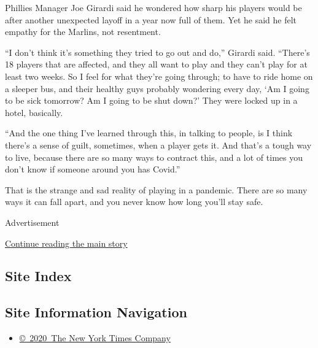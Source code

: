 Phillies Manager Joe Girardi said he wondered how sharp his players
would be after another unexpected layoff in a year now full of them. Yet
he said he felt empathy for the Marlins, not resentment.

``I don't think it's something they tried to go out and do,'' Girardi
said. ``There's 18 players that are affected, and they all want to play
and they can't play for at least two weeks. So I feel for what they're
going through; to have to ride home on a sleeper bus, and their healthy
guys probably wondering every day, `Am I going to be sick tomorrow? Am I
going to be shut down?' They were locked up in a hotel, basically.

``And the one thing I've learned through this, in talking to people, is
I think there's a sense of guilt, sometimes, when a player gets it. And
that's a tough way to live, because there are so many ways to contract
this, and a lot of times you don't know if someone around you has
Covid.''

That is the strange and sad reality of playing in a pandemic. There are
so many ways it can fall apart, and you never know how long you'll stay
safe.

Advertisement

\protect\hyperlink{after-bottom}{Continue reading the main story}

\hypertarget{site-index}{%
\subsection{Site Index}\label{site-index}}

\hypertarget{site-information-navigation}{%
\subsection{Site Information
Navigation}\label{site-information-navigation}}

\begin{itemize}
\tightlist
\item
  \href{https://help.nytimes3xbfgragh.onion/hc/en-us/articles/115014792127-Copyright-notice}{©~2020~The
  New York Times Company}
\end{itemize}

